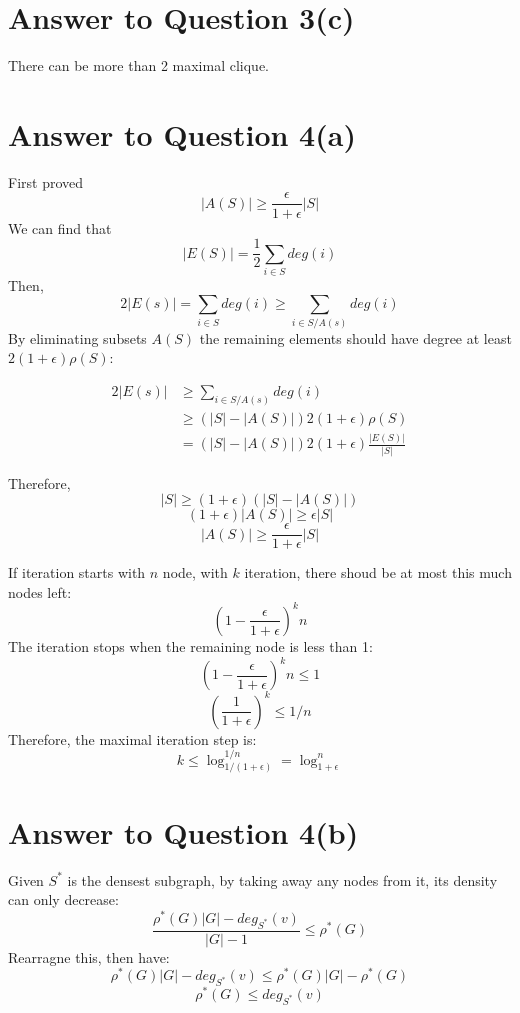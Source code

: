 \documentclass[11pt]{article}
\begin{document}
\pagebreak[4]
\section*{Answer to Question 3(c)}
There can be more than 2 maximal clique.

\pagebreak[4]
\section*{Answer to Question 4(a)}
First proved
$$
|A(S)| \geq \frac{\epsilon}{1+\epsilon}|S|
$$
We can find that
$$
|E(S)| = \frac{1}{2}\sum_{i\in S}deg(i)
$$
Then,
$$
2|E(s)| = \sum_{i\in S}deg(i) \geq \sum_{i\in S/A(s)}deg(i)
$$
By eliminating subsets $A(S)$ the remaining elements should have degree at least $2(1+\epsilon)\rho(S)$:

\begin{equation*}
\begin{aligned}
2|E(s)| & \geq \sum_{i\in S/A(s)}deg(i)\\
& \geq (|S|-|A(S)|)2(1+\epsilon)\rho(S)\\
& = (|S|-|A(S)|)2(1+\epsilon)\frac{|E(S)|}{|S|}
\end{aligned}
\end{equation*}

Therefore,
$$
|S| \geq (1+\epsilon)(|S|-|A(S)|)
$$
$$
(1+\epsilon)|A(S)| \geq \epsilon|S|
$$
\begin{equation}
|A(S)| \geq \frac{\epsilon}{1+\epsilon}|S|
\end{equation}

If iteration starts with $n$ node, with $k$ iteration, there shoud be at most this much nodes left:
$$
\left(1 - \frac{\epsilon}{1+\epsilon}\right)^{k}n
$$
The iteration stops when the remaining node is less than 1:
$$
\left(1 - \frac{\epsilon}{1+\epsilon}\right)^{k}n \leq 1
$$
$$
\left(\frac{1}{1+\epsilon}\right)^k \leq 1/n
$$
Therefore, the maximal iteration step is:
\begin{equation}
k \leq \log_{1/(1+\epsilon)}^{1/n} = \log_{1+\epsilon}^{n}
\end{equation}


\pagebreak[4]
\section*{Answer to Question 4(b)}
Given $S^{*}$ is the densest subgraph, by taking away any nodes from it, its density can only decrease:
$$
\frac{\rho^{*}(G)|G|-deg_{S^{*}}(v)}{|G|-1} \leq \rho^{*}(G)
$$
Rearragne this, then have:
$$
\rho^{*}(G)|G|-deg_{S^{*}}(v) \leq \rho^{*}(G)|G| - \rho^{*}(G)
$$
\begin{equation}
\rho^{*}(G) \leq deg_{S^{*}}(v)
\end{equation}
\end{document}
